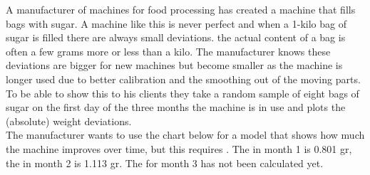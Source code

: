 \setcounter{section}{3}
\setcounter{subsection}{2}
\setcounter{question}{0}



A manufacturer of machines for food processing has created a machine that fills bags with sugar. A machine like this is never perfect and when a 1-kilo bag of sugar is filled there are always small deviations. the actual content of a bag is often a few grams more or less than a kilo. The manufacturer knows these deviations are bigger for new machines but become smaller as the machine is longer used due to better calibration and the smoothing out of the moving parts. To be able to show this to his clients they take a random sample of eight bags of sugar on the first day of the three months the machine is in use and plots the (absolute) weight deviations. \\

The manufacturer wants to use the chart below for a model that shows how much the machine improves over time, but this requires . The  in month 1 is 0.801 gr, the  in month 2 is 1.113 gr. The  for month 3 has not been calculated yet. \\

